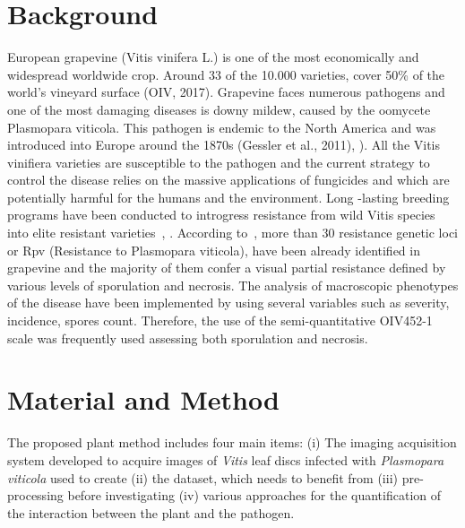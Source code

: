\documentclass[english]{article}
\begin{document}

\begin{abstract}

\end{abstract}

\section{Background}
European grapevine (Vitis vinifera L.) is one of the most economically and widespread worldwide crop. Around 33 of the  10.000 varieties,  cover 50\% of the world's vineyard surface (OIV, 2017).
Grapevine faces numerous pathogens and one of the most damaging diseases is downy mildew, caused by the oomycete Plasmopara viticola. This pathogen is endemic to the North America and was introduced into Europe around the 1870s  (Gessler et al., 2011), \parencite{fontaineEuropeBridgeheadWorldwide2021}). All the Vitis vinifiera varieties are susceptible to the pathogen and the current strategy to control the disease  relies on the massive applications of fungicides and which are potentially harmful for the humans and the environment. Long -lasting breeding programs have been conducted to introgress resistance from wild Vitis species into elite resistant varieties~\parencite{merdinogluBreedingDurableResistance2018}, \parencite{topferCoolClimatePerspective2022}. According to~\parencite{possamaiPhenotypingQTLIdentification2022}, more than 30 resistance genetic loci or Rpv (Resistance to Plasmopara viticola), have been already identified in grapevine and the majority of them confer a visual partial resistance defined by various levels of sporulation and  necrosis. The analysis of macroscopic phenotypes of the disease have been implemented by using several variables such as severity, incidence, spores count. Therefore, the use of the semi-quantitative OIV452-1~\parencite{OIVDescriptorList2009} scale was frequently used assessing both sporulation and necrosis.

\section{Material and Method}

The proposed plant method includes four main items: (i) The imaging acquisition system developed to acquire images of \textit{Vitis} leaf discs infected with \textit{Plasmopara viticola} used to create (ii) the dataset, which needs to benefit from (iii) pre-processing before investigating (iv) various approaches for the quantification of the interaction between the plant and the pathogen.
\end{document}
